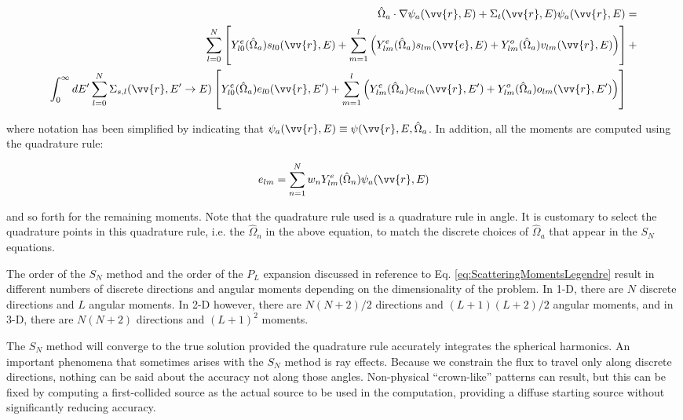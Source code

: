 \documentclass[10pt]{article}
\begin{document}
\begin{flushleft}
\begin{equation}
\label{eq:SnGeneral}
\begin{aligned}
 \hat{\Omega}_a\cdot\nabla\psi_a(\vv{r}, E) + 
 \Sigma_t(\vv{r},E)\psi_a(\vv{r}, E) = \\
\sum_{l=0}^{N}\left\lbrack Y_{l0}^e(\hat{\Omega}_a)s_{l0}(\vv{r},E)+\sum_{m=1}^{l}\left(Y_{lm}^e(\hat{\Omega}_a)s_{lm}(\vv{e},E)+Y_{lm}^o(\hat{\Omega}_a)v_{lm}(\vv{r},E)\right)\right\rbrack+\\
\int_{0}^{\infty}dE' \sum_{l=0}^{N}\Sigma_{s,l}(\vv{r}, E'\rightarrow E)\left\lbrack Y_{l0}^e(\hat{\Omega}_a)e_{l0}(\vv{r},E')+\sum_{m=1}^{l}\left(Y_{lm}^e(\hat{\Omega}_a)e_{lm}(\vv{r},E')+Y_{lm}^o(\hat{\Omega}_a)o_{lm}(\vv{r},E')\right)\right\rbrack\quad\\
\end{aligned}
\end{equation}

where notation has been simplified by indicating that \(\psi_a(\vv{r},E)\equiv\psi(\vv{r},E,\hat{\Omega}_a\). In addition, all the moments are computed using the quadrature rule:

\begin{equation}
e_{lm}=\sum_{n=1}^{N} w_nY_{lm}^e(\hat{\Omega}_n)\psi_a(\vv{r},E)
\end{equation}

and so forth for the remaining moments. Note that the quadrature rule used is a quadrature rule in angle. It is customary to select the quadrature points in this quadrature rule, i.e. the \(\hat{\Omega}_n\) in the above equation, to match the discrete choices of \(\hat{\Omega}_a\) that appear in the \(S_N\) equations. 

The order of the \(S_N\) method and the order of the \(P_L\) expansion discussed in reference to Eq. \ref{eq:ScatteringMomentsLegendre} result in different numbers of discrete directions and angular moments depending on the dimensionality of the problem. In 1-D, there are \(N\) discrete directions and \(L\) angular moments. In 2-D however, there are \(N(N+2)/2\) directions and \((L+1)(L+2)/2\) angular moments, and in 3-D, there are \(N(N+2)\) directions and \((L+1)^2\) moments. 

The \(S_N\) method will converge to the true solution provided the quadrature rule accurately integrates the spherical harmonics. An important phenomena that sometimes arises with the \(S_N\) method is ray effects. Because we constrain the flux to travel only along discrete directions, nothing can be said about the accuracy not along those angles. Non-physical ``crown-like'' patterns can result, but this can be fixed by computing a first-collided source as the actual source to be used in the computation, providing a diffuse starting source without significantly reducing accuracy. 


\end{flushleft}
\end{document}
